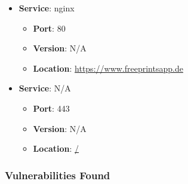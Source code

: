 \documentclass{article}
\begin{document}
\begin{itemize}
    
        \item \textbf{Service}: nginx
        \begin{itemize}
            \item \textbf{Port}: 80
            \item \textbf{Version}:  N/A 
            \item \textbf{Location}: \href{ https://www.freeprintsapp.de }{ https://www.freeprintsapp.de }
        \end{itemize}
    
        \item \textbf{Service}: N/A
        \begin{itemize}
            \item \textbf{Port}: 443
            \item \textbf{Version}:  N/A 
            \item \textbf{Location}: \href{ / }{ / }
        \end{itemize}
    
\end{itemize}


\subsubsection*{Vulnerabilities Found}
\end{document}
